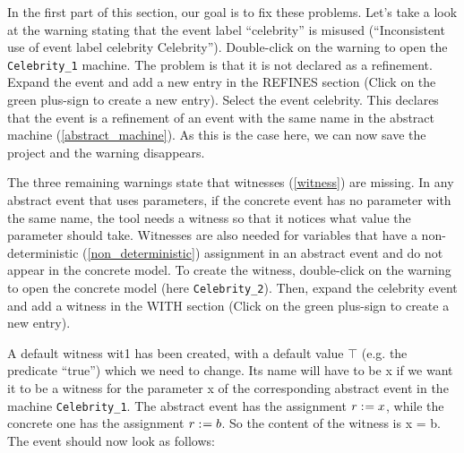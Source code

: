 In the first part of this section, our goal is to fix these problems. Let's take a look at the warning stating that the event label ``celebrity'' is misused (``Inconsistent use of event label celebrity	Celebrity''). Double-click on the warning to open the \texttt{Celebrity\_1} machine. The problem is that it is not declared as a refinement. Expand the event and add a new entry in the \textsf{REFINES} section (Click on the green plus-sign to create a new entry). Select the event \textsf{celebrity}. This declares that the event is a refinement of an event with the same name in the abstract machine (\ref{abstract_machine}). As this is the case here, we can now save the project and the warning disappears.

The three remaining warnings state that witnesses (\ref{witness}) are missing. In any abstract event that uses parameters, if the concrete event has no parameter with the same name, the tool needs a witness so that it notices what value the parameter should take. Witnesses are also needed for variables that have a non-deterministic (\ref{non_deterministic}) assignment in an abstract event and do not appear in the concrete model. To create the witness, double-click on the warning to open the concrete model (here \texttt{Celebrity\_2}). Then, expand the \textsf{celebrity} event and add a witness in the \textsf{WITH} section (Click on the green plus-sign to create a new entry).

A default witness \textsf{wit1} has been created, with a default value \textsf{$\top$} (e.g. the predicate ``true'') which we need to change. Its name will have to be \textsf{x} if we want it to be a witness for the parameter \textsf{x} of the corresponding abstract event in the machine \texttt{Celebrity\_1}. The abstract event has the assignment \textsf{$r \mathrel{:\mkern1mu=} x$}, while the concrete one has the assignment \textsf{$r \mathrel{:\mkern1mu=} b$}. So the content of the witness is \textsf{x = b}. The event should now look as follows: 

\begin{description}
		\begin{description}
		\WhenGrd
			\begin{description}
			\end{description}
		\Witnesses
			\begin{description}
			\nItem{ x }{ x=b }
			\end{description}
		\ThenAct
			\begin{description}
			\nItemX{ act1 }{ r :=  b }
			\end{description}
		\EndAct
		\end{description}
\end{description}

